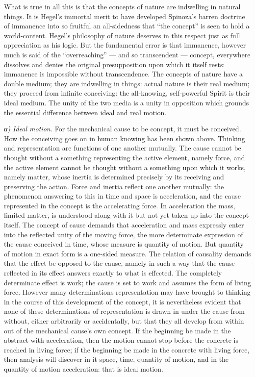 \documentclass[12pt,a4paper]{book}
\newcommand{\subrunin}[1]{\emph{#1}\hspace{0.4em}}
\begin{document}
What is true in all this is that the concepts of nature are indwelling in natural things. It is
Hegel's immortal merit to have developed Spinoza's barren doctrine of immanence into so fruitful
an all-sidedness that ``the concept'' is seen to hold a world-content. Hegel's philosophy of
nature deserves in this respect just as full appreciation as his logic. But the fundamental error
is that immanence, however much is said of the ``overreaching'' --- and so transcendent ---
concept, everywhere dissolves and denies the original presupposition upon which it itself rests:
immanence is impossible without transcendence. The concepts of nature have a double medium; they
are indwelling in things: actual nature is their real medium; they proceed from infinite
conceiving: the all-knowing, self-powerful Spirit is their ideal medium. The unity of the two
media is a unity in opposition which grounds the essential difference between ideal and real
motion.

\subrunin{α) Ideal motion.} For the mechanical cause to be concept, it must be conceived. How the
conceiving goes on in human knowing has been shown above. Thinking and representation are
functions of one another mutually. The cause cannot be thought without a something representing
the active element, namely force, and the active element cannot be thought without a something
upon which it works, namely matter, whose inertia is determined precisely by its receiving and
preserving the action. Force and inertia reflect one another mutually: the phenomenon answering
to this in time and space is acceleration, and the cause represented in the concept is the
accelerating force. In acceleration the mass, limited matter, is understood along with it but not
yet taken up into the concept itself. The concept of cause demands that acceleration and mass
expressly enter into the reflected unity of the moving force, the more determinate expression of
the cause conceived in time, whose measure is quantity of motion. But quantity of motion in exact
form is a one-sided measure. The relation of causality demands that the effect be opposed to the
cause, namely in such a way that the cause reflected in its effect answers exactly to what is
effected. The completely determinate effect is work; the cause is set to work and assumes the
form of living force. However many determinations representation may have brought to thinking in
the course of this development of the concept, it is nevertheless evident that none of these
determinations of representation is drawn in under the cause from without, either arbitrarily or
accidentally, but that they all develop from within out of the mechanical cause's own concept. If
the beginning be made in the abstract with acceleration, then the motion cannot stop before the
concrete is reached in living force; if the beginning be made in the concrete with living force,
then analysis will discover in it space, time, quantity of motion, and in the quantity of motion
acceleration: that is ideal motion.
\end{document}
